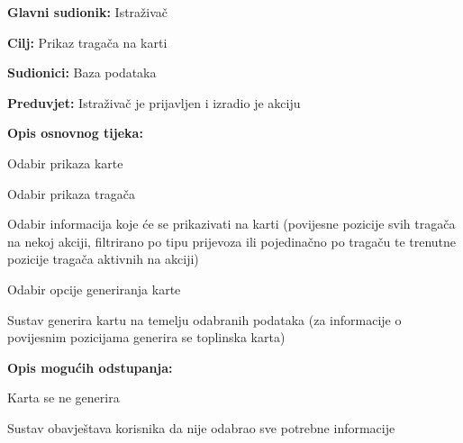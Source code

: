 						
						
				\noindent {}
				\begin{packed_item}
					
					\item \textbf{Glavni sudionik: }Istraživač
					\item  \textbf{Cilj:} Prikaz tragača na karti
					\item  \textbf{Sudionici:} Baza podataka
					\item  \textbf{Preduvjet:} Istraživač je prijavljen i izradio je akciju
					\item  \textbf{Opis osnovnog tijeka:}
					
					\item[] \begin{packed_enum}
						
						\item Odabir prikaza karte
						\item Odabir prikaza tragača
						\item Odabir informacija koje će se prikazivati na karti (povijesne pozicije svih tragača na nekoj akciji, filtrirano po tipu prijevoza ili pojedinačno po tragaču te trenutne pozicije tragača aktivnih na akciji)
						\item Odabir opcije generiranja karte
						\item Sustav generira kartu na temelju odabranih podataka (za informacije o povijesnim pozicijama generira se toplinska karta)
						
					\end{packed_enum}
					
					\item  \textbf{Opis mogućih odstupanja:}
					
					\item[] \begin{packed_item}
						
						\item[5.a]Karta se ne generira 
						\item[] \begin{packed_enum}
							
							\item Sustav obavještava korisnika da nije odabrao sve potrebne informacije
							
						\end{packed_enum}
						
					\end{packed_item}
				\end{packed_item}
				
